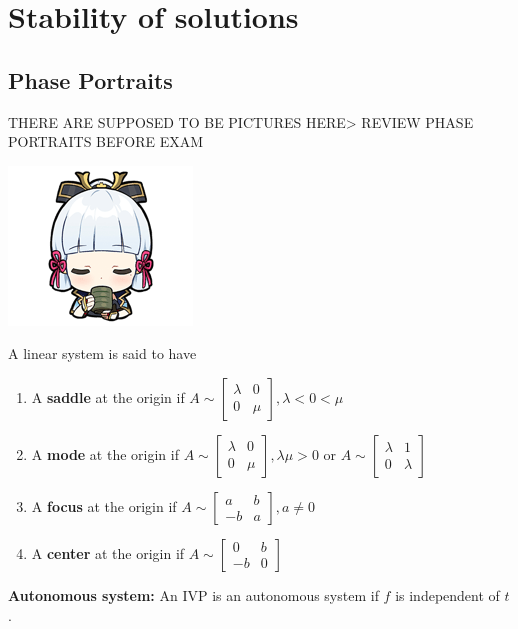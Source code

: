\documentclass{tufte-book}
\begin{document}
\chapter{Stability of solutions}
\section{Phase Portraits}
THERE ARE SUPPOSED TO BE PICTURES HERE> REVIEW PHASE PORTRAITS BEFORE EXAM
\begin{marginfigure}
	\includegraphics{8.png}
\end{marginfigure}
\begin{tcolorbox}[colback=red!5!white]
	A linear system is said to have 
	\begin{enumerate}
		\item A \textbf{saddle} at the origin if $A\sim\begin{bmatrix}
			\lambda &0\\0 &\mu
		\end{bmatrix},\lambda<0<\mu$
		\item A \textbf{mode} at the origin if $A\sim\begin{bmatrix}
			\lambda &0\\0 &\mu
		\end{bmatrix},\lambda\mu>0$ or  $A\sim\begin{bmatrix}
			\lambda &1\\0 &\lambda
		\end{bmatrix}$
		\item A \textbf{focus} at the origin if $A\sim\begin{bmatrix}
			a &b\\-b &a
		\end{bmatrix},a\ne0$
		\item A \textbf{center} at the origin if $A\sim\begin{bmatrix}
			0 &b\\-b &0
		\end{bmatrix}$
	\end{enumerate}
\end{tcolorbox}
\begin{tcolorbox}[colback=red!5!white]
	\textbf{Autonomous system: }An IVP is an autonomous system if $f$ is independent of $t$. 
\end{tcolorbox}
\end{document}
